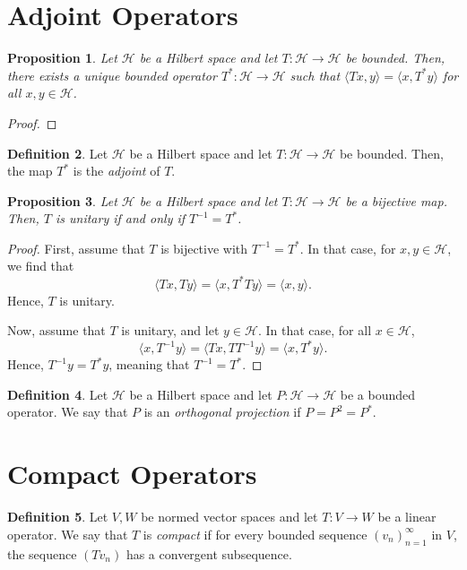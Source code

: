 \documentclass[a4paper, openany]{memoir}
\theoremstyle{definition}
\newtheorem{definition}{Definition}[section]
\theoremstyle{plain}
\newtheorem{proposition}[definition]{Proposition}
\begin{document}
    \section{Adjoint Operators}
    \begin{proposition}
        Let $\mathcal{H}$ be a Hilbert space and let $T \colon \mathcal{H} \to \mathcal{H}$ be bounded. Then, there exists a unique bounded operator $T^* \colon \mathcal{H} \to \mathcal{H}$ such that $\langle Tx, y \rangle = \langle x, T^*y \rangle$ for all $x, y \in \mathcal{H}$.
    \end{proposition}
    \begin{proof}
    \end{proof}

    \begin{definition}
        Let $\mathcal{H}$ be a Hilbert space and let $T \colon \mathcal{H} \to \mathcal{H}$ be bounded. Then, the map $T^*$ is the \emph{adjoint} of $T$.
    \end{definition}


    \begin{proposition}
        Let $\mathcal{H}$ be a Hilbert space and let $T \colon \mathcal{H} \to \mathcal{H}$ be a bijective map. Then, $T$ is unitary if and only if $T^{-1} = T^*$.
    \end{proposition}
    \begin{proof}
        First, assume that $T$ is bijective with $T^{-1} = T^*$. In that case, for $x, y \in \mathcal{H}$, we find that
        \[\langle Tx, Ty \rangle = \langle x, T^*T y \rangle = \langle x, y \rangle.\]
        Hence, $T$ is unitary.

        Now, assume that $T$ is unitary, and let $y \in \mathcal{H}$. In that case, for all $x \in \mathcal{H}$,
        \[\langle x, T^{-1} y \rangle = \langle Tx, TT^{-1} y\rangle = \langle x, T^*y \rangle.\]
        Hence, $T^{-1}y = T^*y$, meaning that $T^{-1} = T^*$.
    \end{proof}

    \begin{definition}
        Let $\mathcal{H}$ be a Hilbert space and let $P \colon \mathcal{H} \to \mathcal{H}$ be a bounded operator. We say that $P$ is an \emph{orthogonal projection} if $P = P^2 = P^*$.
    \end{definition}
    \newpage

    \section{Compact Operators}
    \begin{definition}
        Let $V, W$ be normed vector spaces and let $T \colon V \to W$ be a linear operator. We say that $T$ is \emph{compact} if for every bounded sequence $(v_n)_{n=1}^\infty$ in $V$, the sequence $(Tv_n)$ has a convergent subsequence.
    \end{definition}
\end{document}
